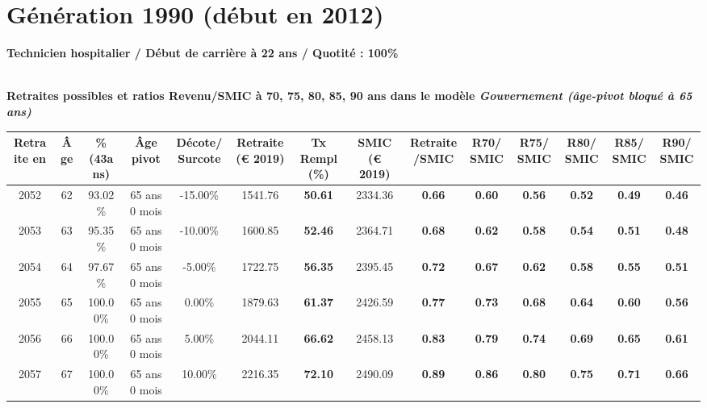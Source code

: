 \newpage 
 
\section{Génération 1990 (début en 2012)\label{TechHosp_100_22_1990_0}} 
 
{\bf \noindent Technicien hospitalier / Début de carrière à 22 ans / Quotité : 100\%}  ~ 

 ~\\{\bf \noindent Retraites possibles et ratios Revenu/SMIC à 70, 75, 80, 85, 90 ans dans le modèle \emph{Gouvernement (âge-pivot bloqué à 65 ans)}}  
 
\begin{adjustbox}{max width=\textwidth} 
\begin{tabular}[htb]{|c|c||c|c|c||c|c||c|c||c|c|c|c|c|} 
\hline 
 Retraite en &  Âge &  \%(43ans) &  Âge pivot &  Décote/Surcote &  Retraite (\euro{} 2019) &  Tx Rempl(\%) &  SMIC (\euro{} 2019) &  Retraite/SMIC &  R70/SMIC &  R75/SMIC &  R80/SMIC &  R85/SMIC &  R90/SMIC \\ 
\hline \hline 
 2052 &  62 &  93.02\% &  65 ans 0 mois &  -15.00\% &  1541.76 &  {\bf 50.61} &  2334.36 &  {\bf {\color{red} 0.66}} &  {\bf {\color{red} 0.60}} &  {\bf {\color{red} 0.56}} &  {\bf {\color{red} 0.52}} &  {\bf {\color{red} 0.49}} &  {\bf {\color{red} 0.46}} \\ 
\hline 
 2053 &  63 &  95.35\% &  65 ans 0 mois &  -10.00\% &  1600.85 &  {\bf 52.46} &  2364.71 &  {\bf {\color{red} 0.68}} &  {\bf {\color{red} 0.62}} &  {\bf {\color{red} 0.58}} &  {\bf {\color{red} 0.54}} &  {\bf {\color{red} 0.51}} &  {\bf {\color{red} 0.48}} \\ 
\hline 
 2054 &  64 &  97.67\% &  65 ans 0 mois &  -5.00\% &  1722.75 &  {\bf 56.35} &  2395.45 &  {\bf {\color{red} 0.72}} &  {\bf {\color{red} 0.67}} &  {\bf {\color{red} 0.62}} &  {\bf {\color{red} 0.58}} &  {\bf {\color{red} 0.55}} &  {\bf {\color{red} 0.51}} \\ 
\hline 
 2055 &  65 &  100.00\% &  65 ans 0 mois &  0.00\% &  1879.63 &  {\bf 61.37} &  2426.59 &  {\bf {\color{red} 0.77}} &  {\bf {\color{red} 0.73}} &  {\bf {\color{red} 0.68}} &  {\bf {\color{red} 0.64}} &  {\bf {\color{red} 0.60}} &  {\bf {\color{red} 0.56}} \\ 
\hline 
 2056 &  66 &  100.00\% &  65 ans 0 mois &  5.00\% &  2044.11 &  {\bf 66.62} &  2458.13 &  {\bf {\color{red} 0.83}} &  {\bf {\color{red} 0.79}} &  {\bf {\color{red} 0.74}} &  {\bf {\color{red} 0.69}} &  {\bf {\color{red} 0.65}} &  {\bf {\color{red} 0.61}} \\ 
\hline 
 2057 &  67 &  100.00\% &  65 ans 0 mois &  10.00\% &  2216.35 &  {\bf 72.10} &  2490.09 &  {\bf {\color{red} 0.89}} &  {\bf {\color{red} 0.86}} &  {\bf {\color{red} 0.80}} &  {\bf {\color{red} 0.75}} &  {\bf {\color{red} 0.71}} &  {\bf {\color{red} 0.66}} \\ 
\hline 
\hline 
\end{tabular} 
\end{adjustbox} 
 
